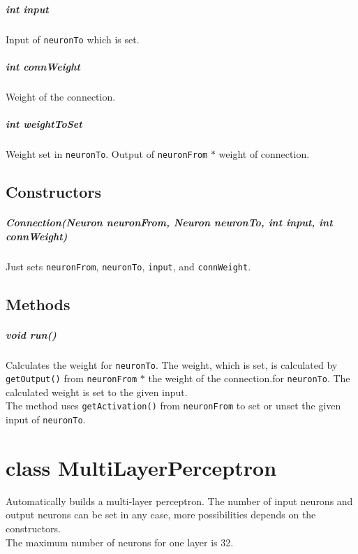 \paragraph{int input}
Input of \texttt{neuronTo} which is set.

\paragraph{int connWeight}
Weight of the connection.

\paragraph{int weightToSet}
Weight set in \texttt{neuronTo}. Output of \texttt{neuronFrom} $*$ weight of connection.

\section{Constructors}
\paragraph{Connection(Neuron neuronFrom, Neuron neuronTo, int input, int connWeight)}
Just sets \texttt{neuronFrom}, \texttt{neuronTo}, \texttt{input}, and \texttt{connWeight}.

\section{Methods}
\paragraph{void run()}
Calculates the weight for \texttt{neuronTo}. The weight, which is set, is calculated by \texttt{getOutput()} from \texttt{neuronFrom} $*$ the weight of the connection.for \texttt{neuronTo}. The calculated weight is set to the given input.\\
The method uses \texttt{getActivation()} from \texttt{neuronFrom} to set or unset the given input of \texttt{neuronTo}.

\chapter{class MultiLayerPerceptron}
Automatically builds a multi-layer perceptron. The number of input neurons and output neurons can be set in any case, more possibilities depends on the constructors.\\
The maximum number of neurons for one layer is 32.

